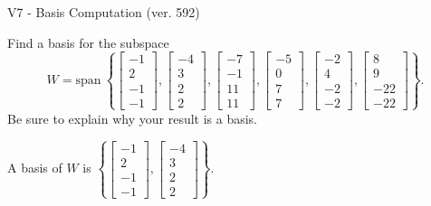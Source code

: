 \begin{exercise}
  \begin{exerciseTitle}V7 - Basis Computation (ver. 592)\end{exerciseTitle}
  \begin{exerciseStatement}
    Find a basis for the subspace 
\[W=\mathrm{span}\ \left\{\left[\begin{array}{r}
-1 \\
2 \\
-1 \\
-1
\end{array}\right] , \left[\begin{array}{r}
-4 \\
3 \\
2 \\
2
\end{array}\right] , \left[\begin{array}{r}
-7 \\
-1 \\
11 \\
11
\end{array}\right] , \left[\begin{array}{r}
-5 \\
0 \\
7 \\
7
\end{array}\right] , \left[\begin{array}{r}
-2 \\
4 \\
-2 \\
-2
\end{array}\right] , \left[\begin{array}{r}
8 \\
9 \\
-22 \\
-22
\end{array}\right]\right\}.\]
 Be sure to explain why your result is a basis.


  \end{exerciseStatement}
  \begin{exerciseAnswer}
   A basis of \(W\) is  \(\left\{\left[\begin{array}{r}
-1 \\
2 \\
-1 \\
-1
\end{array}\right] , \left[\begin{array}{r}
-4 \\
3 \\
2 \\
2
\end{array}\right]\right\}\).
  


  \end{exerciseAnswer}
\end{exercise}